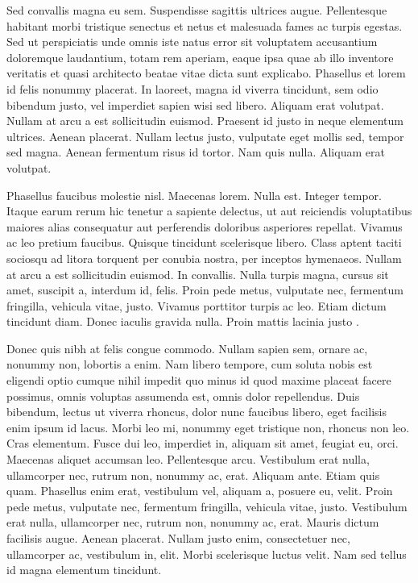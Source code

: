 Sed convallis magna eu sem. Suspendisse sagittis ultrices augue. Pellentesque habitant morbi tristique senectus et netus et malesuada fames ac turpis egestas. Sed ut perspiciatis unde omnis iste natus error sit voluptatem accusantium doloremque laudantium, totam rem aperiam, eaque ipsa quae ab illo inventore veritatis et quasi architecto beatae vitae dicta sunt explicabo. Phasellus et lorem id felis nonummy placerat. In laoreet, magna id viverra tincidunt, sem odio bibendum justo, vel imperdiet sapien wisi sed libero. Aliquam erat volutpat. Nullam at arcu a est sollicitudin euismod. Praesent id justo in neque elementum ultrices. Aenean placerat. Nullam lectus justo, vulputate eget mollis sed, tempor sed magna. Aenean fermentum risus id tortor. Nam quis nulla. Aliquam erat volutpat.

Phasellus faucibus molestie nisl. Maecenas lorem. Nulla est. Integer tempor. Itaque earum rerum hic tenetur a sapiente delectus, ut aut reiciendis voluptatibus maiores alias consequatur aut perferendis doloribus asperiores repellat. Vivamus ac leo pretium faucibus. Quisque tincidunt scelerisque libero. Class aptent taciti sociosqu ad litora torquent per conubia nostra, per inceptos hymenaeos. Nullam at arcu a est sollicitudin euismod. In convallis. Nulla turpis magna, cursus sit amet, suscipit a, interdum id, felis. Proin pede metus, vulputate nec, fermentum fringilla, vehicula vitae, justo. Vivamus porttitor turpis ac leo. Etiam dictum tincidunt diam. Donec iaculis gravida nulla. Proin mattis lacinia justo \cite{grisetti2010tutorial}.

Donec quis nibh at felis congue commodo. Nullam sapien sem, ornare ac, nonummy non, lobortis a enim. Nam libero tempore, cum soluta nobis est eligendi optio cumque nihil impedit quo minus id quod maxime placeat facere possimus, omnis voluptas assumenda est, omnis dolor repellendus. Duis bibendum, lectus ut viverra rhoncus, dolor nunc faucibus libero, eget facilisis enim ipsum id lacus. Morbi leo mi, nonummy eget tristique non, rhoncus non leo. Cras elementum. Fusce dui leo, imperdiet in, aliquam sit amet, feugiat eu, orci. Maecenas aliquet accumsan leo. Pellentesque arcu. Vestibulum erat nulla, ullamcorper nec, rutrum non, nonummy ac, erat. Aliquam ante. Etiam quis quam. Phasellus enim erat, vestibulum vel, aliquam a, posuere eu, velit. Proin pede metus, vulputate nec, fermentum fringilla, vehicula vitae, justo. Vestibulum erat nulla, ullamcorper nec, rutrum non, nonummy ac, erat. Mauris dictum facilisis augue. Aenean placerat. Nullam justo enim, consectetuer nec, ullamcorper ac, vestibulum in, elit. Morbi scelerisque luctus velit. Nam sed tellus id magna elementum tincidunt.

